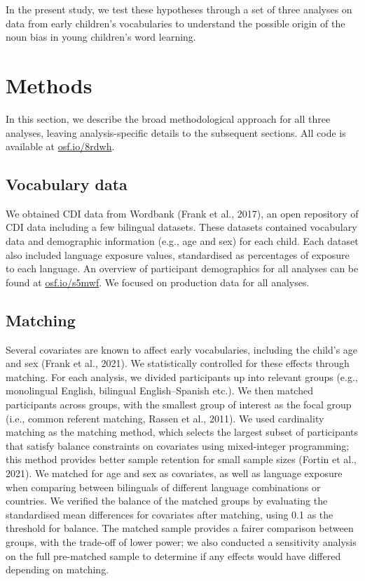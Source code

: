 \documentclass[10pt, letterpaper]{article}
\begin{document}
In the present study, we test these hypotheses through a set of three
analyses on data from early children's vocabularies to understand the
possible origin of the noun bias in young children's word learning.

\section{Methods}\label{methods}

In this section, we describe the broad methodological approach for all
three analyses, leaving analysis-specific details to the subsequent
sections. All code is available at
\href{https://osf.io/8rdwh/?view_only=a6e76ebe23b6422d8e1f90c1093da9db}{osf.io/8rdwh}.

\subsection{Vocabulary data}\label{vocabulary-data}

We obtained CDI data from Wordbank (Frank et al., 2017), an open
repository of CDI data including a few bilingual datasets. These
datasets contained vocabulary data and demographic information (e.g.,
age and sex) for each child. Each dataset also included language
exposure values, standardised as percentages of exposure to each
language. An overview of participant demographics for all analyses can
be found at
\href{https://osf.io/s5mwf?view_only=a6e76ebe23b6422d8e1f90c1093da9db}{osf.io/s5mwf}.
We focused on production data for all analyses.

\subsection{Matching}\label{matching}

Several covariates are known to affect early vocabularies, including the
child's age and sex (Frank et al., 2021). We statistically controlled
for these effects through matching. For each analysis, we divided
participants up into relevant groups (e.g., monolingual English,
bilingual English--Spanish etc.). We then matched participants across
groups, with the smallest group of interest as the focal group (i.e.,
common referent matching, Rassen et al., 2011). We used cardinality
matching as the matching method, which selects the largest subset of
participants that satisfy balance constraints on covariates using
mixed-integer programming; this method provides better sample retention
for small sample sizes (Fortin et al., 2021). We matched for age and sex
as covariates, as well as language exposure when comparing between
bilinguals of different language combinations or countries. We verified
the balance of the matched groups by evaluating the standardised mean
differences for covariates after matching, using 0.1 as the threshold
for balance. The matched sample provides a fairer comparison between
groups, with the trade-off of lower power; we also conducted a
sensitivity analysis on the full pre-matched sample to determine if any
effects would have differed depending on matching.
\end{document}
